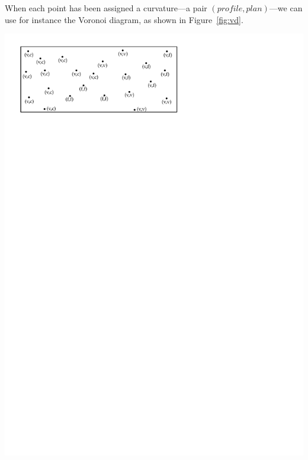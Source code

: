 When each point has been assigned a curvature---a pair $(profile,plan)$---we can use for instance the Voronoi diagram, as shown in Figure~\ref{fig:vd}.
\begin{marginfigure}
  \centering
  \includegraphics[page=1,width=\linewidth]{figs/vd}

\end{marginfigure}
